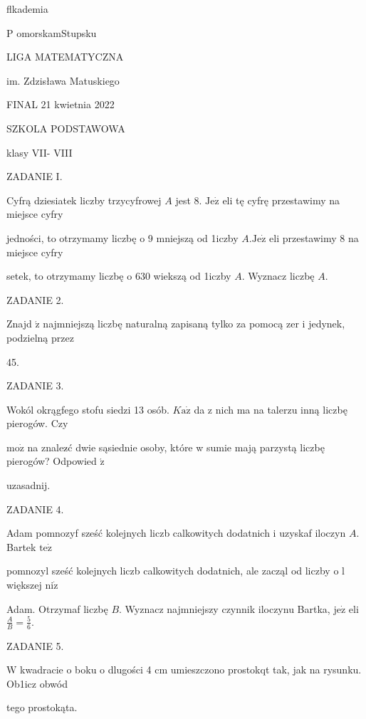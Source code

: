 \documentclass[a4paper,12pt]{article}
\begin{document}
flkademia

P omorskamStupsku

LIGA MATEMATYCZNA

im. Zdzisława Matuskiego

FINAL 21 kwietnia 2022

SZKOLA PODSTAWOWA

klasy VII- VIII

ZADANIE I.

Cyfrą dziesiatek liczby trzycyfrowej $A$ jest 8. $\mathrm{J}\mathrm{e}\dot{\mathrm{z}}$ eli tę cyfrę przestawimy na miejsce cyfry

jedności, to otrzymamy liczbę o 9 mniejszą od 1iczby $A. \mathrm{J}\mathrm{e}\dot{\mathrm{z}}$ eli przestawimy 8 na miejsce cyfry

setek, to otrzymamy liczbę o 630 wiekszą od 1iczby $A$. Wyznacz liczbę $A.$

ZADANIE 2.

Znajd $\acute{\mathrm{z}}$ najmniejszą liczbę naturalną zapisaną tylko za pomocą zer i jedynek, podzielną przez

45.

ZADANIE 3.

Wokól okrągfego stofu siedzi 13 osób. $K\mathrm{a}\dot{\mathrm{z}}$ da z nich ma na talerzu inną liczbę pierogów. Czy

$\mathrm{m}\mathrm{o}\dot{\mathrm{z}}$ na znalez$\acute{}$ć dwie sąsiednie osoby, które w sumie mają parzystą liczbę pierogów? Odpowied $\acute{\mathrm{z}}$

uzasadnij.

ZADANIE 4.

Adam pomnozyf sześć kolejnych liczb calkowitych dodatnich i uzyskaf iloczyn $A$. Bartek $\mathrm{t}\mathrm{e}\dot{\mathrm{z}}$

pomnozyl sześć kolejnych liczb calkowitych dodatnich, ale zacząl od liczby o l większej $\mathrm{n}\mathrm{i}\dot{\mathrm{z}}$

Adam. Otrzymaf liczbę $B$. Wyznacz najmniejszy czynnik iloczynu Bartka, $\mathrm{j}\mathrm{e}\dot{\mathrm{z}}$ eli $\displaystyle \frac{A}{B}=\frac{5}{6}.$

ZADANIE 5.

$\mathrm{W}$ kwadracie o boku o dlugości 4 cm umieszczono prostokqt tak, jak na rysunku. Ob1icz obwód

tego prostokąta.
\end{document}
